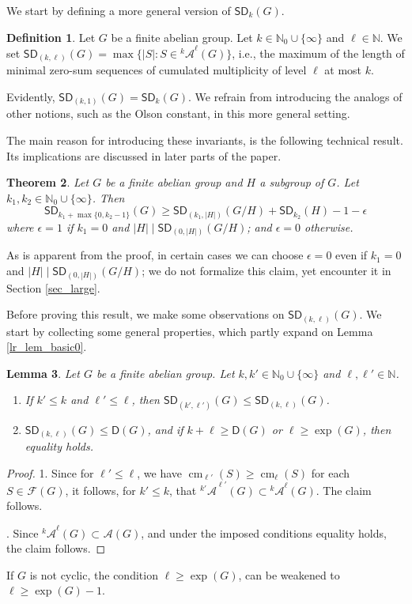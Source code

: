 \documentclass{amsart}
\newtheorem{thm}{Theorem}[section]
\newtheorem{lem}[thm]{Lemma}
\theoremstyle{definition}
\newtheorem{df}[thm]{Definition}
\numberwithin{equation}{section}
\begin{document}
We start by defining a more general version of ${\mathsf{SD}}_k(G)$.

\begin{df}
Let $G$ be a finite abelian group. Let $k \in \mathbb{N}_0\cup\{\infty\}$
and $\ell\in \mathbb{N}$.
We set ${\mathsf{SD}}_{(k,\ell)}(G)= \max \{|S| \colon S \in {{}^{{k}}\!\mathcal{A}}^{\ell} (G)\}$, i.e., the maximum of the length of minimal zero-sum sequences of cumulated multiplicity of level $\ell$ at most $k$.
\end{df}
Evidently, ${\mathsf{SD}}_{(k,1)}(G)= {\mathsf{SD}}_{k}(G)$.
We refrain from introducing the analogs of other notions, such as the Olson constant, in this more general setting.

The main reason for introducing these invariants, is the following technical
result. Its implications are discussed in later parts of the paper.

\begin{thm}
\label{thm_abstractbound}
Let $G$ be a finite abelian group and $H$ a subgroup of $G$. Let $k_1,k_2 \in \mathbb{N}_0\cup \{\infty \}$.
Then
\[
{\mathsf{SD}}_{k_1 + \max\{0,k_2-1\}  }(G) \ge {\mathsf{SD}}_{(k_1,|H|)}(G/H)+ {\mathsf{SD}}_{k_2}(H) -1 - \epsilon
\]
where $\epsilon = 1 $ if $k_1= 0$ and $|H| \mid {\mathsf{SD}}_{(0,|H|)}(G/H)$; and $\epsilon =0$ otherwise.
\end{thm}
As is apparent from the proof, in certain cases we can choose $\epsilon=0$ even if
$k_1=0$ and $|H| \mid {\mathsf{SD}}_{(0,|H|)}(G/H)$; we do not formalize this claim, yet encounter it in
Section \ref{sec_large}.

Before proving this result, we make some observations on
${\mathsf{SD}}_{(k,\ell)}(G)$.
We start by collecting some general properties, which partly expand on Lemma \ref{lr_lem_basic0}.

\begin{lem}
Let $G$ be a finite abelian group. Let $k,k' \in \mathbb{N}_0\cup\{\infty\}$
and $\ell,\ell' \in \mathbb{N}$.
\begin{enumerate}
\item If $k'\le k$ and $\ell' \le \ell$, then ${\mathsf{SD}}_{(k',\ell')}(G)\le {\mathsf{SD}}_{(k,\ell)}(G)$.
\item ${\mathsf{SD}}_{(k,\ell)}(G)\le {\mathsf{D}}(G)$, and if $k +\ell \ge {\mathsf{D}}(G)$ or $\ell \ge \exp(G)$, then equality holds.
\end{enumerate}
\end{lem}
\begin{proof}
1. Since for $\ell' \le \ell$, we have $\operatorname{cm}_{\ell'}(S)\ge \operatorname{cm}_{\ell}(S)$ for each $S\in {{}^{{}}\!\mathcal{F}}(G)$, it follows, for $k'\le k$, that ${{}^{{k'}}\!\mathcal{A}}^{\ell'}(G)\subset {{}^{{k}}\!\mathcal{A}}^{\ell}(G)$.  The claim follows.

. Since ${{}^{{k}}\!\mathcal{A}}^{\ell}(G)\subset {{}^{{}}\!\mathcal{A}}(G)$, and under the
imposed conditions equality holds, the claim follows.
\end{proof}
If $G$ is not cyclic, the condition $\ell\ge \exp(G)$,
can be weakened to $\ell \ge \exp(G)-1$.
\end{document}
